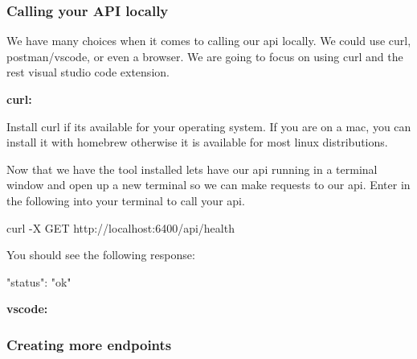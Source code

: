 \documentclass{csse4400}
\begin{document}
\subsubsection{Calling your API locally}

We have many choices when it comes to calling our api locally. We could use curl, postman/vscode, or even a browser. We are going to focus on using curl and the rest visual studio code extension.


\textbf{curl:}

Install curl if its available for your operating system. If you are on a mac, you can install it with homebrew otherwise it is available for most linux distributions.

Now that we have the tool installed lets have our api running in a terminal window and open up a new terminal so we can make requests to our api. Enter in the following into your terminal to call your api.


\begin{code}[language=bash]{}
curl -X GET http://localhost:6400/api/health
\end{code}

You should see the following response:

\begin{code}[language=json]{}
{
  "status": "ok"
}
\end{code}

\textbf{vscode:}

\subsubsection{Creating more endpoints}





\end{document}
